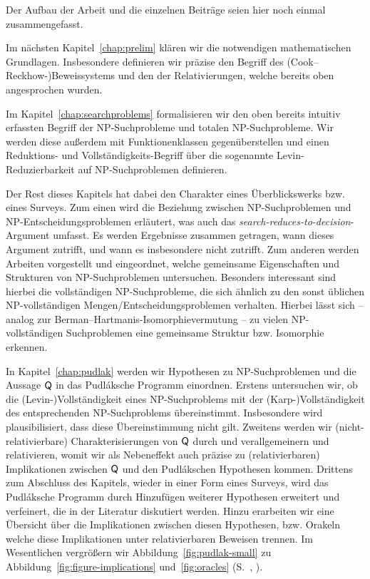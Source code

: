 Der Aufbau der Arbeit und die einzelnen Beiträge seien hier noch einmal zusammengefasst.

Im nächsten Kapitel~\ref{chap:prelim} klären wir die notwendigen mathematischen Grundlagen. Insbesondere definieren wir präzise den Begriff des (Cook--Reckhow-)Beweissystems und den der Relativierungen, welche bereits oben angesprochen wurden.

Im Kapitel~\ref{chap:searchproblems} formalisieren wir den oben bereits intuitiv erfassten Begriff der NP-Suchprobleme und totalen NP-Suchprobleme. 
Wir werden diese außerdem mit Funktionenklassen gegenüberstellen und einen Reduktions- und Vollständigkeits-Begriff über die sogenannte Levin-Reduzierbarkeit auf NP-Suchproblemen definieren.

Der Rest dieses Kapitels hat dabei den Charakter eines Überblickswerks bzw. eines Surveys. 
Zum einen wird die Beziehung zwischen NP-Suchproblemen und NP-Entscheidungsproblemen erläutert, was auch das \emph{search-reduces-to-decision}-Argument umfasst. Es werden Ergebnisse zusammen getragen, wann dieses Argument zutrifft, und wann es insbesondere nicht zutrifft.
Zum anderen werden Arbeiten vorgestellt und eingeordnet, welche gemeinsame Eigenschaften und Strukturen von NP-Suchproblemen untersuchen. Besonders interessant sind hierbei die vollständigen NP-Suchprobleme, die sich ähnlich zu den sonst üblichen NP-vollständigen Mengen/Entscheidungsproblemen verhalten. Hierbei lässt sich -- analog zur Berman--Hartmanis-Isomorphievermutung -- zu vielen NP-vollständigen Suchproblemen eine gemeinsame Struktur bzw. Isomorphie erkennen.

In Kapitel~\ref{chap:pudlak} werden wir Hypothesen zu NP-Suchproblemen und die Aussage $\mathsf{Q}$ in das Pudláksche Programm einordnen. Erstens untersuchen wir, ob die (Levin-)Vollständigkeit eines NP-Suchproblems  mit der (Karp-)Vollständigkeit des entsprechenden NP-Suchproblems übereinstimmt. Insbesondere wird plausibilisiert, dass diese Übereinstimmung nicht gilt.
Zweitens werden wir (nicht-relativierbare) Charakterisierungen von $\mathsf{Q}$ durch \textcite{fenner_inverting_2003} und \textcite{messner_simulation_2001} verallgemeinern und relativieren, womit wir als Nebeneffekt auch präzise zu (relativierbaren) Implikationen zwischen $\mathsf{Q}$ und den Pudlákschen Hypothesen kommen.
Drittens zum Abschluss des Kapitels, wieder in einer Form eines Surveys, wird das Pudláksche Programm durch Hinzufügen weiterer Hypothesen erweitert und verfeinert, die in der Literatur diskutiert werden. Hinzu erarbeiten wir eine Übersicht über die Implikationen zwischen diesen Hypothesen, bzw. Orakeln welche diese Implikationen unter relativierbaren Beweisen trennen. Im Wesentlichen vergrößern wir Abbildung~\ref{fig:pudlak-small} zu Abbildung~\ref{fig:figure-implications} und~\ref{fig:oracles} (S.~\pageref{fig:figure-implications}, \pageref{fig:oracles}).

